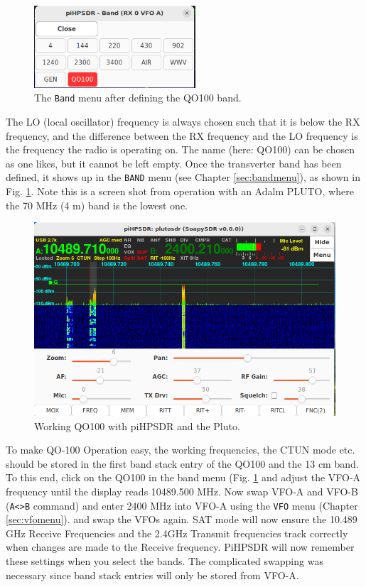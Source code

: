 \documentclass[12pt]{book}
\def\bltt#1{\texttt{\color{blue}#1}}
\def\pH{pi\-HPSDR }
\begin{document}
\begin{figure}[ht]
\center
\includegraphics[width=6cm]{QO100-BandMenu.png}
\caption{The \bltt{Band} menu after defining the QO100 band.}
\label{fig:QO100-BandMenu}
\end{figure}

The LO (local oscillator) frequency is always chosen such that it is below the RX frequency,
and the difference between the RX frequency and the LO frequency is the frequency the radio
is operating on. The name (here: QO100) can be chosen as one likes, but it cannot be left
empty. Once the transverter band has been defined, it shows up in the \bltt{BAND} menu
(see Chapter \ref{sec:bandmenu}), as shown in Fig. \ref{fig:QO100-BandMenu}. Note this is
a screen shot from operation with an Adalm PLUTO, where the 70 MHz (4 m) band is the lowest one.

\begin{figure}[ht]
\center
\includegraphics[width=12cm]{QO100-Waterfall.png}
\caption{Working QO100 with \pH and the Pluto.}
\label{fig:QO100-Waterfall}
\end{figure}



To make QO-100 Operation easy, the working frequencies, the CTUN mode etc. should be
stored in the first band stack entry of the QO100 and the 13 cm band. To this end,
click on the QO100 in the band menu (Fig. \ref{fig:QO100-BandMenu} and adjust the VFO-A
frequency until the display reads 10489.500 MHz. Now swap VFO-A and VFO-B (\bltt{A<>B} command)
and enter 2400 MHz into VFO-A using the \bltt{VFO} menu (Chapter \ref{sec:vfomenu}). and
swap the VFOs again. SAT mode will now ensure the 10.489 GHz Receive
 Frequencies and the 2.4GHz Transmit frequencies track correctly when changes are made
 to the Receive frequency. PiHPSDR will now remember these settings when you select
 the bands. The complicated swapping was necessary since band stack entries will
 only be stored from VFO-A.
\end{document}
